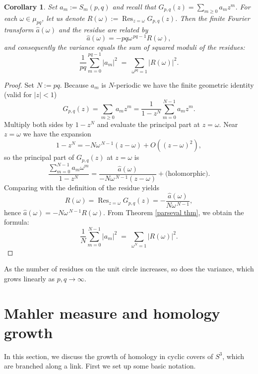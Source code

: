 \documentclass[table]{amsart}
\newtheorem{corollary}[theorem]{Corollary}
\numberwithin{equation}{section}
\begin{document}
\begin{corollary}
Set \(a_m:=S_m(p,q)\) and recall that $G_{p,q}(z)=\sum_{m\ge 0} a_m z^m$. For each \(\omega\in \mu_{pq}\), let us denote $R(\omega):=\operatorname{Res}_{z=\omega}G_{p,q}(z)$. Then the finite Fourier transform \(\widehat a(\omega)\) and the residue are related by
\[
\widehat a(\omega) = -pq\omega^{\,pq-1} R(\omega),
\]
and consequently the variance equals the sum of squared moduli of the residues:
\[
\frac{1}{pq}\sum_{m=0}^{pq-1}\big|a_m\big|^2
\;=\; \sum_{\omega^{pq}=1} \big|R(\omega)\big|^2.
\]
\end{corollary}

\begin{proof}
Set $N:=pq$. Because \(a_m\) is \(N\)-periodic we have the finite geometric identity (valid for \(|z|<1\))
\[
G_{p,q}(z)=\sum_{m\ge0}a_m z^m
=\frac{1}{1-z^N}\sum_{m=0}^{N-1} a_m z^m.
\]
Multiply both sides by \(1-z^N\) and evaluate the principal part at \(z=\omega\). Near \(z=\omega\) we have the expansion
\[
1-z^N = -N\omega^{\,N-1}(z-\omega)+O((z-\omega)^2),
\]
so the principal part of \(G_{p,q}(z)\) at \(z=\omega\) is
\[
\frac{\sum_{m=0}^{N-1} a_m \omega^m}{1-z^N}
=\frac{\widehat a(\omega)}{-N\omega^{\,N-1}(z-\omega)} + \text{(holomorphic)}.
\]
Comparing with the definition of the residue yields
\[
R(\omega)=\operatorname{Res}_{z=\omega}G_{p,q}(z) = -\frac{\widehat a(\omega)}{N\omega^{\,N-1}},
\]
hence \(\widehat a(\omega)=-N\omega^{\,N-1}R(\omega)\). From Theorem \ref{parseval thm}, we obtain the formula:
\[
\frac{1}{N}\sum_{m=0}^{N-1}\big|a_m\big|^2
\;=\; \sum_{\omega^N=1} \big|R(\omega)\big|^2.\]
\end{proof}
\noindent As the number of residues on the unit circle increases, so does the variance, which grows linearly as $p,q\rightarrow \infty$.



\section{Mahler measure and homology growth}
In this section, we discuss the growth of homology in cyclic covers of $S^3$, which are branched along a link. First we set up some basic notation. 
\end{document}
